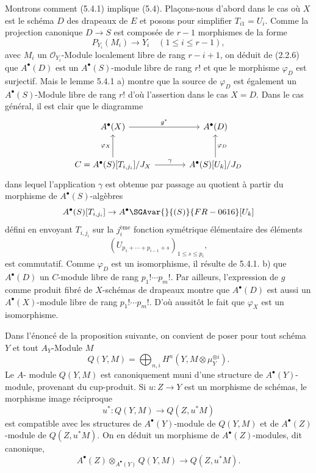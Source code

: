 Montrons comment (5.4.1) implique (5.4). Plaçons-nous d'abord dans le cas 
où $X$ est le
schéma $D$ des drapeaux de $E$ et posons pour simplifier $T_{i1}=U_i$. Comme la projection canonique $D\to S$ est composée de $r-1$ morphismes de la forme
\[
P_{Y_i}(M_i)\to Y_i\quad(1\le i\le r-1),
\]
avec $M_i$ un $\mathcal{O}_{Y_i}$-Module localement libre de rang $r-i+1$, on déduit de (2.2.6) que $A^{\bullet}(D)$ est un $A^{\bullet}(S)$-module libre de rang $r!$ et que le morphisme $\varphi_D$ est surjectif. Mais le lemme 5.4.1 a) montre que la source de $\varphi_D$ est également un $A^{\bullet}(S)$-Module libre de rang $r!$ d'où l'assertion dans le cas $X=D$. Dans le cas général, il est clair que le diagramme
\[
\begin{tikzcd}[column sep=large,row sep=large]
A^{\bullet}(X) \arrow[r,"g^*"] & A^{\bullet}(D)\\
C=A^{\bullet}(S)[T_{i,j_i}]/J_X \arrow[u,"\varphi_X"] \arrow[r,"\gamma"] &
A^{\bullet}(S)[U_k]/J_D \arrow[u,"\varphi_D"']
\end{tikzcd}
\]
dans lequel l'application $\gamma$ est obtenue par passage au quotient à partir du morphisme de $A^{\bullet}(S)$-algèbres
\[
A^\bullet(S)[T_{i,j_i}]\to A^\bullet\SGAvar{}{(S)}{FR-0616}[U_k]
\]
défini en envoyant $T_{i,j_i}$ sur la $j_i^{\text{ème}}$ fonction symétrique élémentaire des éléments
\[
(U_{p_1+\cdots+p_{i-1}+s})_{1\le s\le p_i},
\]
est commutatif. Comme $\varphi_D$ est un isomorphisme, il résulte de 5.4.1. b) que $A^{\bullet}(D)$ un $C$-module libre de rang $p_1!\cdots p_m!$. Par ailleurs, l'expression de $g$ comme produit fibré de $X$-schémas de drapeaux montre que $A^{\bullet}(D)$ est aussi un $A^{\bullet}(X)$-module libre de rang $p_1!\cdots p_m!$. D'où aussitôt le fait que $\varphi_X$ est un isomorphisme.

Dans l'énoncé de la proposition suivante, on convient de poser pour tout schéma $Y$ et tout $A_Y$-Module $M$
\[
Q(Y,M)=\bigoplus_{n,i}H^n(Y,M\otimes\mu_Y^{\otimes i}).
\]
Le $A$-
module $Q(Y,M)$ est canoniquement muni d'une structure de $A^\bullet(Y)$-module, provenant du cup-produit. Si $u:Z\to Y$ est un morphisme de schémas, le morphisme image réciproque
\[
u^*:Q(Y,M)\to Q(Z,u^*M)
\]
est compatible avec les structures de $A^\bullet(Y)$-module de $Q(Y,M)$ et de $A^\bullet(Z)$-module de $Q(Z,u^*M)$. On en déduit un morphisme de $A^\bullet(Z)$-modules, dit canonique,
\[
A^\bullet(Z)\otimes_{A^\bullet(Y)}Q(Y,M)\to Q(Z,u^*M).
\]

